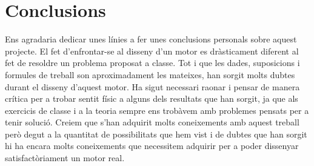 \section{Conclusions}
Ens agradaria dedicar unes línies a fer unes conclusions personals sobre aquest projecte. El fet d'enfrontar-se al disseny d'un motor es dràsticament diferent al fet de resoldre un problema proposat a classe. Tot i que les dades, suposicions i formules de treball son aproximadament les mateixes, han sorgit molts dubtes durant el disseny d'aquest motor. Ha sigut necessari raonar i pensar de manera crítica per a trobar sentit físic a alguns dels resultats que han sorgit, ja que als exercicis de classe i a la teoria sempre ens trobàvem amb problemes pensats per a tenir solució. Creiem que s'han adquirit molts coneixements amb aquest treball però degut a la quantitat de possibilitats que hem vist i de dubtes que han sorgit hi ha encara molts coneixements que necessitem adquirir per a poder dissenyar satisfactòriament un motor real. 